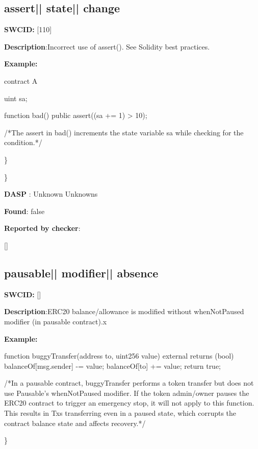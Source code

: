 \documentclass{article}
\begin{document}
\subsection{assert{|\textunderscore| }state{|\textunderscore| }change} 
\textbf{SWC{\textunderscore }ID:} [110]

\textbf{Description}:Incorrect use of assert(). See Solidity best practices.


\textbf{Example:} 
\begin{ffcode} 

contract A {
  uint s\textunderscore a;

  function bad() public {
    assert((s\textunderscore a += 1) > 10);
  }
}
 /*The assert in bad() increments the state variable s\textunderscore a while checking for the condition.*/ 

\end{ffcode} 
\} 

\} 

\textbf{DASP} : Unknown Unknowns

\textbf{Found}: false

\textbf{Reported by checker}: 
\begin{ffcode} 

[]
\end{ffcode} 
\subsection{pausable{|\textunderscore| }modifier{|\textunderscore| }absence} 
\textbf{SWC{\textunderscore }ID:} []

\textbf{Description}:ERC20 balance/allowance is modified without whenNotPaused modifier (in pausable contract).x


\textbf{Example:} 
\begin{ffcode} 

function buggyTransfer(address to, uint256 value) external returns (bool){
        balanceOf[msg.sender] -= value;
        balanceOf[to] += value;
        return true;
    }

 /*In a pausable contract, buggyTransfer performs a token transfer but does not use Pausable's whenNotPaused modifier. If the token admin/owner pauses the ERC20 contract to trigger an emergency stop, it will not apply to this function. This results in Txs transferring even in a paused state, which corrupts the contract balance state and affects recovery.*/ 

\end{ffcode} 
\} 
\end{document}
